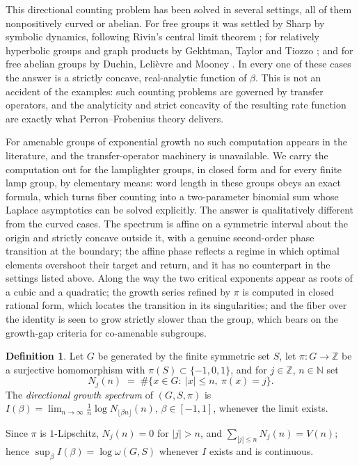\documentclass[11pt]{amsart}
\theoremstyle{definition}
\newtheorem{definition}[theorem]{Definition}
\theoremstyle{remark}
\newcommand{\N}{\mathbb{N}}
\newcommand{\Z}{\mathbb{Z}}
\begin{document}
This directional counting problem has been solved in several settings, all of them nonpositively curved or abelian. For free groups it was settled by Sharp \cite{Sharp01} by symbolic dynamics, following Rivin's central limit theorem \cite{Rivin10}; for relatively hyperbolic groups and graph products by Gekhtman, Taylor and Tiozzo \cite{GTT20}; and for free abelian groups by Duchin, Leli\`evre and Mooney \cite{DLM12}. In every one of these cases the answer is a strictly concave, real-analytic function of $\beta$. This is not an accident of the examples: such counting problems are governed by transfer operators, and the analyticity and strict concavity of the resulting rate function are exactly what Perron--Frobenius theory delivers.

For amenable groups of exponential growth no such computation appears in the literature, and the transfer-operator machinery is unavailable. We carry the computation out for the lamplighter groups, in closed form and for every finite lamp group, by elementary means: word length in these groups obeys an exact formula, which turns fiber counting into a two-parameter binomial sum whose Laplace asymptotics can be solved explicitly. The answer is qualitatively different from the curved cases. The spectrum is affine on a symmetric interval about the origin and strictly concave outside it, with a genuine second-order phase transition at the boundary; the affine phase reflects a regime in which optimal elements overshoot their target and return, and it has no counterpart in the settings listed above. Along the way the two critical exponents appear as roots of a cubic and a quadratic; the growth series refined by $\pi$ is computed in closed rational form, which locates the transition in its singularities; and the fiber over the identity is seen to grow strictly slower than the group, which bears on the growth-gap criteria for co-amenable subgroups.

\begin{definition}\label{def:spectrum}
Let $G$ be generated by the finite symmetric set $S$, let $\pi\colon G\to\Z$ be a surjective homomorphism with $\pi(S)\subset\{-1,0,1\}$, and for $j\in\Z$, $n\in\N$ set
\[
N_j(n)\;=\;\#\{x\in G:\ |x|\le n,\ \pi(x)=j\}.
\]
The \emph{directional growth spectrum} of $(G,S,\pi)$ is
$I(\beta)=\lim_{n\to\infty}\tfrac1n\log N_{\lfloor\beta n\rfloor}(n)$, $\beta\in[-1,1]$, whenever the limit exists.
\end{definition}

Since $\pi$ is $1$-Lipschitz, $N_j(n)=0$ for $|j|>n$, and $\sum_{|j|\le n}N_j(n)=V(n)$; hence $\sup_\beta I(\beta)=\log\omega(G,S)$ whenever $I$ exists and is continuous.
\end{document}
